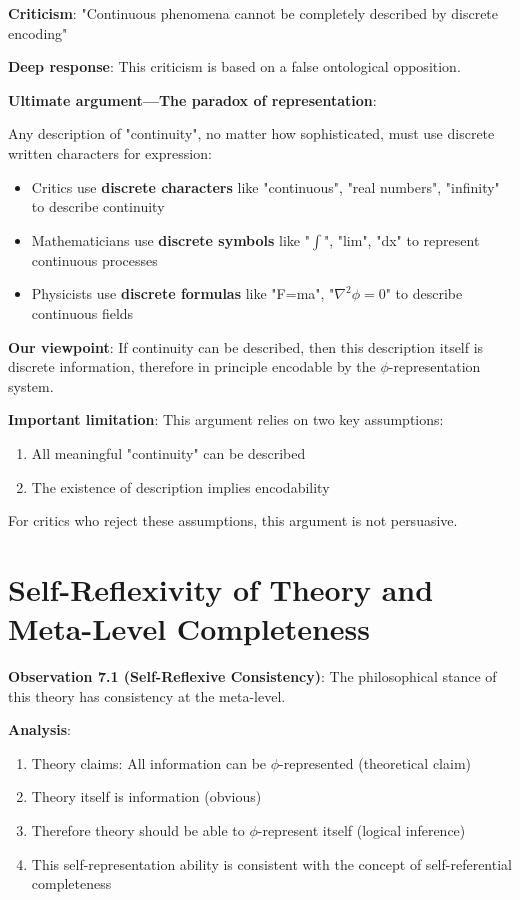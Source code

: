 \textbf{Criticism}: "Continuous phenomena cannot be completely described by discrete encoding"

\textbf{Deep response}: This criticism is based on a false ontological opposition.

\textbf{Ultimate argument---The paradox of representation}:

Any description of "continuity", no matter how sophisticated, must use discrete written characters for expression:

\begin{itemize}
\item Critics use \textbf{discrete characters} like "continuous", "real numbers", "infinity" to describe continuity
\item Mathematicians use \textbf{discrete symbols} like "$\int$", "lim", "dx" to represent continuous processes
\item Physicists use \textbf{discrete formulas} like "F=ma", "$\nabla^2\phi=0$" to describe continuous fields
\end{itemize}

\textbf{Our viewpoint}: If continuity can be described, then this description itself is discrete information, therefore in principle encodable by the $\phi$-representation system.

\textbf{Important limitation}: This argument relies on two key assumptions:
\begin{enumerate}
\item All meaningful "continuity" can be described
\item The existence of description implies encodability
\end{enumerate}

For critics who reject these assumptions, this argument is not persuasive.

\section{Self-Reflexivity of Theory and Meta-Level Completeness}
\label{sec:ch07_defense:self-reflexivity-of-theory-and-meta-level-completeness}

\textbf{Observation 7.1 (Self-Reflexive Consistency)}: The philosophical stance of this theory has consistency at the meta-level.
\label{obs:7.1}

\textbf{Analysis}:
\begin{enumerate}
\item Theory claims: All information can be $\phi$-represented (theoretical claim)
\item Theory itself is information (obvious)
\item Therefore theory should be able to $\phi$-represent itself (logical inference)
\item This self-representation ability is consistent with the concept of self-referential completeness
\end{enumerate}

